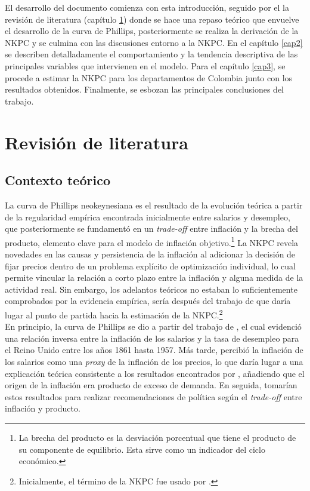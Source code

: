 El desarrollo del documento comienza con esta introducción, seguido por el la revisión de literatura (capítulo \ref{cap1}) donde se hace una repaso teórico que envuelve el desarrollo de la curva de Phillips, posteriormente se realiza la derivación de la NKPC y se culmina con las discusiones entorno a la NKPC. En el capítulo \ref{cap2} se describen detalladamente el comportamiento y la tendencia descriptiva de las principales variables que intervienen en el modelo. Para el capítulo \ref{cap3}, se procede a estimar la NKPC para los departamentos de Colombia junto con los resultados obtenidos. Finalmente, se esbozan las principales conclusiones del trabajo.

\chapter{Revisión de literatura} \label{cap1}
\section{Contexto teórico} \label{sec1}

La curva de Phillips neokeynesiana es el resultado de la evolución teórica a partir de la regularidad empírica encontrada inicialmente entre salarios y desempleo, que posteriormente se fundamentó en un \textit{trade-off} entre inflación y la brecha del producto, elemento clave para el modelo de inflación objetivo.\footnote{La brecha del producto es la desviación porcentual que tiene el producto de su componente de equilibrio. Esta sirve como un indicador del ciclo económico.}  La NKPC revela novedades en las causas y persistencia de la inflación al adicionar la decisión de fijar precios dentro de un problema explícito de optimización individual, lo cual permite vincular la relación a corto plazo entre la inflación y alguna medida de la actividad real. Sin embargo, los adelantos teóricos no estaban lo suficientemente comprobados por la evidencia empírica, sería después del trabajo de \cite{gali1999inflation} que daría lugar al punto de partida hacia la estimación de la NKPC.\footnote{Inicialmente, el término de la NKPC fue usado por \cite{roberts1995new}.} \\

En principio, la curva de Phillips se dio a partir del trabajo de \cite{phillips1958relation}, el cual evidenció una relación inversa entre la inflación de los salarios y la tasa de desempleo para el Reino Unido entre los años 1861 hasta 1957. Más tarde, \cite{lipsey1960relation}   percibió la inflación de los salarios como una \textit{proxy} de la inflación de los precios, lo que daría lugar a una explicación teórica consistente a los resultados encontrados por \cite{phillips1958relation}, añadiendo que el origen de la inflación era producto de exceso de demanda. En seguida, \cite{samuelson1960analytical}  tomarían estos resultados para realizar recomendaciones de política según el \textit{trade-off} entre inflación y producto.\\

